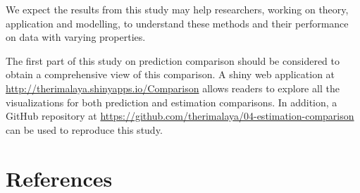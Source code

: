 \documentclass[12pt,3p,authoryear]{elsarticle}
\begin{document}
We expect the results from this study may help researchers, working on
theory, application and modelling, to understand these methods and their
performance on data with varying properties.

The first part of this study \citep{rimal2019pred} on prediction
comparison should be considered to obtain a comprehensive view of this
comparison. A shiny \citep{shiny} web application at
\url{http://therimalaya.shinyapps.io/Comparison} allows readers to
explore all the visualizations for both prediction and estimation
comparisons. In addition, a GitHub repository at
\url{https://github.com/therimalaya/04-estimation-comparison} can be
used to reproduce this study.

\section*{References}\label{references}

\hypertarget{refs}{}


\renewcommand\refname{References}

\end{document}

